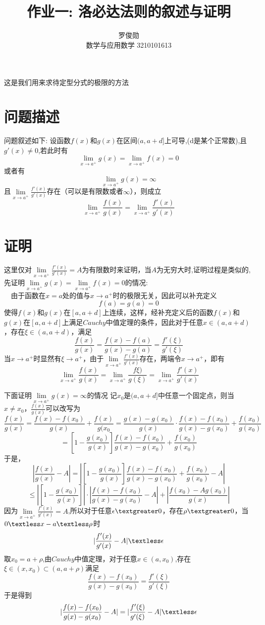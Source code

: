 \documentclass{ctexart}
\title{作业一: 洛必达法则的叙述与证明}
\author{罗俊勋 \\ 数学与应用数学 3210101613}
\begin{document}
\maketitle


    这是我们用来求待定型分式的极限的方法
\section{问题描述}
问题叙述如下: 设函数$f(x)$和$g(x)$在区间$(a,a+d]$上可导,(d是某个正常数),且$g'(x)\neq 0$,若此时有
  \[
  \lim\limits_{x \rightarrow a^{+}}g(x) =\lim\limits_{x\to a^{+}}f(x)=0
  \]
  或者有
  \[
  \lim\limits_{x \rightarrow a^{+} }g(x)=\infty
  \]
  且$\lim\limits_{x \rightarrow a^+}\frac{f'(x)}{g'(x)}$存在（可以是有限数或者$\infty$），则成立
  \[
\lim\limits_{x \rightarrow a^+}\frac{f(x)}{g(x)}=\lim\limits_{x \rightarrow a^+}\frac{f'(x)}{g'(x)}
  \]

  \section{证明}

  这里仅对$\lim\limits_{x \rightarrow a^+}\frac{f'(x)}{g'(x)}=A$为有限数时来证明，当$A$为无穷大时,证明过程是类似的,
  先证明$ \lim\limits_{x \rightarrow a^{+}}g(x) =\lim\limits_{x\to a^{+}}f(x)=0$的情况:
  \\$\quad$由于函数在$x=a$处的值与$x \rightarrow a^+$时的极限无关，因此可以补充定义
  \[
  f(a)=g(a)=0
  \]
  使得$f(x)$和$g(x)$在$[a,a+d]$上连续，这样，经补充定义后的函数$f(x)$和$g(x)$在$[a,a+d]$上满足$Cauchy$中值定理的条件，因此对于任意$x\in (a,a+d)$，存在$\xi \in (a,a+d)$，满足
  \[
  \frac{f(x)}{g(x)}=\frac{f(x)-f(a)}{g(x)-g(a)}=\frac{f'(\xi)}{g'(\xi)}
  \]
  当$x \rightarrow a^+$时显然有$\xi \rightarrow a^+$，由于$\lim\limits_{x \rightarrow a^+} \frac{f'(x)}{g'(x)}$存在，两端令$x \rightarrow a^+$，即有
  \[
  \lim\limits_{x \rightarrow a^+}\frac{f(x)}{g(x)}= \lim\limits_{x \rightarrow a^+}\frac{f\xi)}{g(\xi)}= \lim\limits_{x \rightarrow a^+}\frac{f'(x)}{g'(x)}
  \]

  下面证明$\lim\limits_{x \rightarrow a^+}g(x)=\infty$的情况
  记$x_0$是$(a,a+d]$中任意一个固定点，则当$x \neq x_0$，$\frac{f(x)}{g(x)}$可以改写为
  \[
 \frac{f(x)}{g(x)}=\frac{f(x)-f(x_0)}{g(x)}+\frac{f(x)}{g(x_0 }=\frac{g(x)-g(x_0)}{g(x)} \cdot \frac{f(x)-f(x_0)}{g(x)-g(x_0)}+\frac{f(x_0)}{g(x_0)}  
 \]
 \[
 =[1-\frac{g(x_0)}{g(x)}] \frac{f(x)-f(x_0)}{g(x)-g(x_0)}+\frac{f(x_0)}{g(x_0)}
 \]
 于是，
 \[
 |\frac{f(x)}{g(x)}-A|=|[1-\frac{g(x_0)}{g(x)}] \frac{f(x)-f(x_0)}{g(x)-g(x_0)}+\frac{f(x_0)}{g(x_0)}-A|
 \]
 \[
 \leq |[1-\frac{g(x_0)}{g(x)}]|\cdot| \frac{f(x)-f(x_0)}{g(x)-g(x_0)}-A|+|\frac{f(x_0)-Ag(x_0)}{g(x)}|
 \]
 因为$\lim\limits_{x \to a^+}\frac{f'(x)}{g'(x)}=A$,所以对于任意$\epsilon \textgreater 0$，存在$\rho \textgreater 0$，当$0\textless x-a \textless \rho$时
 \[
 |\frac{f'(x)}{g'(x)}-A|\textless \epsilon
 \]
 取$x_0=a+\rho$,由$Cauchy$中值定理，对于任意$x \in (a,x_0)$,存在$\xi\in(x,x_0)\subset(a,a+\rho) $满足
 \[
 \frac{f(x)-f(x_0)}{g(x)-g(x_0)}=\frac{f'(\xi)}{g'(\xi)}
 \]
 于是得到
 \[
| \frac{f(x)-f(x_0)}{g(x)-g(x_0)}-A|=|\frac{f'(\xi)}{g'(\xi)}-A|\textless \epsilon
 \]
\end{document}
